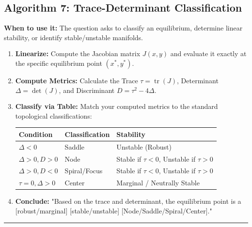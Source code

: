 \documentclass[11pt, a4paper]{report}
\begin{document}
\subsection*{Algorithm 7: Trace-Determinant Classification}
\textbf{When to use it:} The question asks to classify an equilibrium, determine linear stability, or identify stable/unstable manifolds.
\begin{enumerate}[label=\textbf{\arabic*.}]
    \item \textbf{Linearize:} Compute the Jacobian matrix $J(x,y)$ and evaluate it exactly at the specific equilibrium point $(x^*,y^*)$.
    \item \textbf{Compute Metrics:} Calculate the Trace $\tau = \operatorname{tr}(J)$, Determinant $\Delta = \det(J)$, and Discriminant $D = \tau^2 - 4\Delta$.
    \item \textbf{Classify via Table:} Match your computed metrics to the standard topological classifications:
    \begin{center}
    \begin{tabular}{|l|l|l|}
    \hline
    \textbf{Condition} & \textbf{Classification} & \textbf{Stability} \\ \hline
    $\Delta < 0$ & Saddle & Unstable (Robust) \\ \hline
    $\Delta > 0, D > 0$ & Node & Stable if $\tau < 0$, Unstable if $\tau > 0$ \\ \hline
    $\Delta > 0, D < 0$ & Spiral/Focus & Stable if $\tau < 0$, Unstable if $\tau > 0$ \\ \hline
    $\tau = 0, \Delta > 0$ & Center & Marginal / Neutrally Stable \\ \hline
    \end{tabular}
    \end{center}
    \item \textbf{Conclude:} "Based on the trace and determinant, the equilibrium point is a [robust/marginal] [stable/unstable] [Node/Saddle/Spiral/Center]."
\end{enumerate}
\vspace{1em}
\noindent\rule{\textwidth}{0.4pt}
\vspace{1em}
\end{document}

